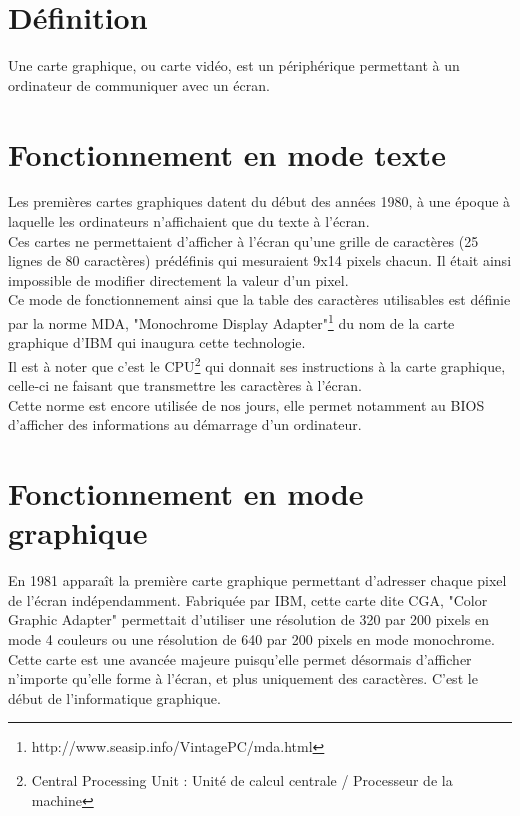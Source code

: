 \section{Définition}
Une carte graphique, ou carte vidéo, est un périphérique permettant à un ordinateur de communiquer 
avec un écran.\\
\section{Fonctionnement en mode texte}
Les premières cartes graphiques datent du début des années 1980, à une époque à laquelle les ordinateurs n'affichaient que du texte à l'écran.\\
Ces cartes ne permettaient d'afficher à l'écran qu'une grille de caractères 
(25 lignes de 80 caractères) prédéfinis qui mesuraient 9x14 pixels chacun. Il était ainsi impossible de modifier directement la valeur d'un pixel.\\
Ce mode de fonctionnement ainsi que la table des caractères utilisables est 
définie par la norme MDA, "Monochrome Display Adapter"\footnote{http://www.seasip.info/VintagePC/mda.html}
du nom de la carte graphique d'IBM qui inaugura cette technologie.\\
Il est à noter que c'est le CPU\footnote{Central Processing Unit : Unité de calcul centrale / Processeur de la machine} qui donnait ses instructions à la carte graphique, celle-ci ne faisant que transmettre les caractères à l'écran.\\
Cette norme est encore utilisée de nos jours, elle permet notamment au BIOS d'afficher des informations au démarrage d'un ordinateur.
\newpage
\section{Fonctionnement en mode graphique}

En 1981 apparaît la première carte graphique permettant d'adresser chaque pixel de l'écran indépendamment.
Fabriquée par IBM, cette carte dite CGA, "Color Graphic Adapter" permettait d'utiliser une résolution de 320 par 200 pixels en mode 4 couleurs ou une résolution de 640 par 200 pixels en mode monochrome.\\
Cette carte est une avancée majeure puisqu'elle permet désormais d'afficher n'importe qu'elle forme à l'écran, et plus uniquement des caractères. C'est le début de l'informatique graphique.

